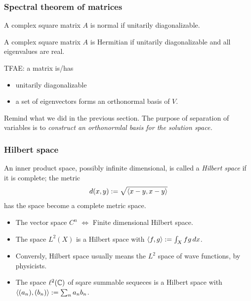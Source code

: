 \documentclass[10pt,handout]{beamer}
\begin{document}
\begin{frame}
\frametitle{Spectral theorem of matrices}
  \begin{thm}
    A complex square matrix $A$ is normal if unitarily diagonalizable.
  \end{thm}
  \begin{thm}
    A complex square matrix $A$ is Hermitian if unitarily diagonalizable and all eigenvalues are real.
  \end{thm}
  \bigskip
  \pause TFAE: a matrix is/has
  \begin{itemize}
    \item unitarily diagonalizable
    \item a set of eigenvectors forms an orthonormal basis of $V$.
  \end{itemize}
  \pause Remind what we did in the previous section.
  The purpose of separation of variables is to \emph{construct an orthonormlal basis for the solution space.}
\end{frame}

\begin{frame}
\frametitle{Hilbert space}
  \pause
  \begin{defn}
    An inner product space, possibly infinite dimensional, is called a \emph{Hilbert space} if it is complete; the metric
    \[d(x,y):=\sqrt{\langle x-y,x-y\rangle}\]
    has the space become a complete metric space.
  \end{defn}
  \pause
  \begin{itemize}[<+->]
    \item The vector space $C^n$ $\iff$ Finite dimensional Hilbert space.
    \item The space $L^2(X)$ is a Hilbert space with $\langle f,g\rangle:=\int_X fg\,dx$.
    \item Conversly, Hilbert space usually means the $L^2$ space of wave functions, by physicists.
    \item The space $\ell^2(\mathbb{C})$ of sqare summable sequeces is a Hilbert space with $\langle(a_n),(b_n)\rangle:=\sum_na_nb_n$.
  \end{itemize}
\end{frame}
\end{document}
